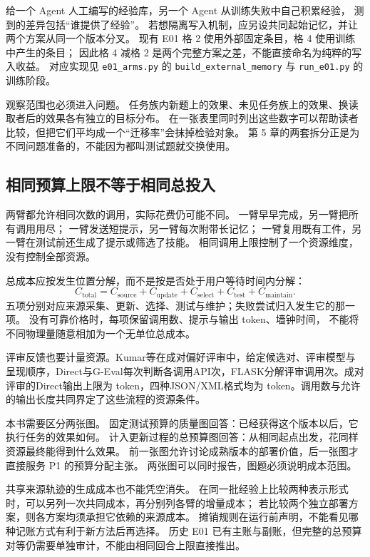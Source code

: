 给一个 Agent 人工编写的经验库，另一个 Agent 从训练失败中自己积累经验，
测到的差异包括“谁提供了经验”。
若想隔离写入机制，应另设共同起始记忆，并让两个方案从同一个版本分叉。
现有 E01 格 2 使用外部固定条目，格 4 使用训练中产生的条目；
因此格 4 减格 2 是两个完整方案之差，不能直接命名为纯粹的写入收益。
对应实现见 \texttt{e01\_arms.py} 的 \texttt{build\_external\_memory} 与
\texttt{run\_e01.py} 的训练阶段。

观察范围也必须进入问题。
任务族内新题上的效果、未见任务族上的效果、换读取者后的效果各有独立的目标分布。
在一张表里同时列出这些数字可以帮助读者比较，但把它们平均成一个“迁移率”会抹掉检验对象。
第 5 章的两套拆分正是为不同问题准备的，不能因为都叫测试题就交换使用。

\subsection{相同预算上限不等于相同总投入}

两臂都允许相同次数的调用，实际花费仍可能不同。
一臂早早完成，另一臂把所有调用用尽；
一臂发送短提示，另一臂每次附带长记忆；
一臂复用既有工件，另一臂在测试前还生成了提示或筛选了技能。
相同调用上限控制了一个资源维度，没有控制全部资源。

总成本应按发生位置分解，而不是按是否处于用户等待时间内分解：
\begin{equation}
  C_{\mathrm{total}}=
  C_{\mathrm{source}}+C_{\mathrm{update}}+C_{\mathrm{select}}
  +C_{\mathrm{test}}+C_{\mathrm{maintain}}.
  \label{eq:ch03-cost-scope}
\end{equation}
五项分别对应来源采集、更新、选择、测试与维护；失败尝试归入发生它的那一项。
没有可靠价格时，每项保留调用数、提示与输出 token、墙钟时间，
不能将不同物理量随意相加为一个无单位总成本。

评审反馈也要计量资源。Kumar等在成对偏好评审中，给定候选对、评审模型与呈现顺序，Direct与G-Eval每次判断各调用API次，FLASK分解评审调用次。成对评审的Direct输出上限为 token，四种JSON/XML格式均为 token。调用数与允许的输出长度共同界定了这些流程的资源条件\cite{all-verdicts-2610-aacl}。

本书需要区分两张图。
固定测试预算的质量图回答：已经获得这个版本以后，它执行任务的效果如何。
计入更新过程的总预算图回答：从相同起点出发，花同样资源最终能得到什么效果。
前一张图允许讨论成熟版本的部署价值，后一张图才直接服务 P1 的预算分配主张。
两张图可以同时报告，图题必须说明成本范围。

共享来源轨迹的生成成本也不能凭空消失。
在同一批经验上比较两种表示形式时，可以另列一次共同成本，再分别列各臂的增量成本；
若比较两个独立部署方案，则各方案均须承担它依赖的来源成本。
摊销规则在运行前声明，不能看见哪种记账方式有利于新方法后再选择。
历史 E01 已有主账与副账，但完整的总预算对等仍需要单独审计，不能由相同回合上限直接推出。


